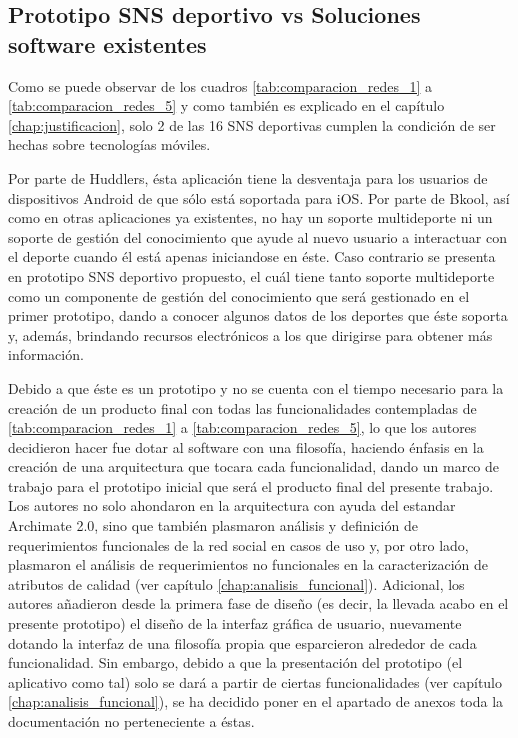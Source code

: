 \subsection{Prototipo SNS deportivo vs Soluciones software existentes}

Como se puede observar de los cuadros \ref{tab:comparacion_redes_1} a \ref{tab:comparacion_redes_5} y como también es explicado en el capítulo \ref{chap:justificacion}, solo 2 de las 16 SNS deportivas cumplen la condición de ser hechas sobre tecnologías móviles.

Por parte de Huddlers, ésta aplicación tiene la desventaja para los usuarios de dispositivos Android de que sólo está soportada para iOS. Por parte de Bkool, así como en otras aplicaciones ya existentes, no hay un soporte multideporte ni un soporte de gestión del conocimiento que ayude al nuevo usuario a interactuar con el deporte cuando él está apenas iniciandose en éste. Caso contrario se presenta en prototipo SNS deportivo propuesto, el cuál tiene tanto soporte multideporte como un componente de gestión del conocimiento que será gestionado en el primer prototipo, dando a conocer algunos datos de los deportes que éste soporta y, además, brindando recursos electrónicos a los que dirigirse para obtener más información.

Debido a que éste es un prototipo y no se cuenta con el tiempo necesario para la creación de un producto final con todas las funcionalidades contempladas de \ref{tab:comparacion_redes_1} a \ref{tab:comparacion_redes_5}, lo que los autores decidieron hacer fue dotar al software con una filosofía, haciendo énfasis en la creación de una arquitectura que tocara cada funcionalidad, dando un marco de trabajo para el prototipo inicial que será el producto final del presente trabajo. Los autores no solo ahondaron en la arquitectura con ayuda del estandar Archimate 2.0, sino que también plasmaron análisis y definición de requerimientos funcionales de la red social en casos de uso y, por otro lado, plasmaron el análisis de requerimientos no funcionales en la caracterización de atributos de calidad (ver capítulo \ref{chap:analisis_funcional}). Adicional, los autores añadieron desde la primera fase de diseño (es decir, la llevada acabo en el presente prototipo) el diseño de la interfaz gráfica de usuario, nuevamente dotando la interfaz de una filosofía propia que esparcieron alrededor de cada funcionalidad. Sin embargo, debido a que la presentación del prototipo (el aplicativo como tal) solo se dará a partir de ciertas funcionalidades (ver capítulo \ref{chap:analisis_funcional}), se ha decidido poner en el apartado de anexos toda la documentación no perteneciente a éstas.

